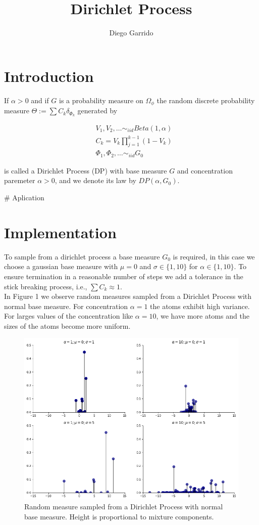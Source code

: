 \documentclass{article}
\title{Dirichlet Process}
\author{Diego Garrido}
\begin{document}
\maketitle
\href{https://nbviewer.jupyter.org/github/dgarridoa/dirichlet_process/blob/master/Dirichlet_Process.ipynb}{\color{blue}{Jupyter Notebook}}
\section{Introduction}

If $\alpha>0$ and if $G$ is a probability measure on $\Omega_{\phi}$ the random discrete probability measure $\Theta:=\sum C_{k}\delta_{\Phi_{k}}$ generated by

\begin{align}
& V_{1}, V_{2}, \ldots \sim_{iid} Beta(1, \alpha)\\
& C_{k} = V_{k}\prod_{j=1}^{k-1}(1-V_{k})\\
& \Phi_{1}, \Phi_{2}, \ldots \sim_{iid} G_{0}
\end{align}

is called a Dirichlet Process (DP) with base measure $G$ and concentration paremeter $\alpha>0$, and we denote its law by $DP(\alpha, G_{0})$.

# Aplication


\section{Implementation}

To sample from a dirichlet process a base measure $G_{0}$ is required, in this case we choose a gaussian base measure with $\mu = 0$ and $\sigma \in \{1, 10\}$ for $\alpha \in \{1,10\}$. To ensure termination in a reasonable number of steps we add a tolerance in the stick breaking process, i.e., $\sum C_{k} \approx 1$.\\

In Figure 1 we observe random measures sampled from a Dirichlet Process with normal base measure. For concentration $\alpha=1$ the atoms exhibit high variance. For larges values of the concentration like $\alpha=10$, we have more atoms and the sizes of the atoms become more uniform.

\begin{figure}[h]
\includegraphics[scale=0.4]{dirichlet_process.png}
\caption{Random measure sampled from a Dirichlet Process with normal base measure. Height is proportional to mixture components.}
\end{figure}
\end{document}
